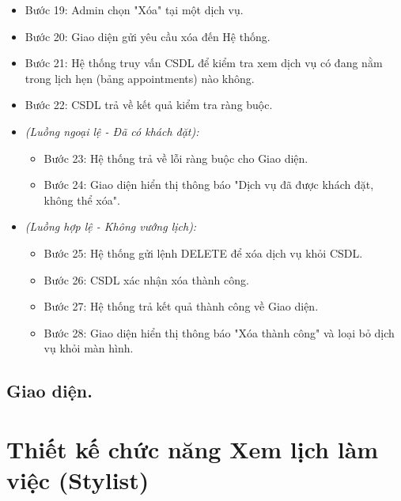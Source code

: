 \documentclass[../BTL.tex]{subfiles}
\begin{document}
\begin{itemize}
\item
  Bước 19: Admin chọn "Xóa" tại một dịch vụ.
\item
  Bước 20: Giao diện gửi yêu cầu xóa đến Hệ thống.
\item
  Bước 21: Hệ thống truy vấn CSDL để kiểm tra xem dịch vụ có đang nằm
  trong lịch hẹn (bảng appointments) nào không.
\item
  Bước 22: CSDL trả về kết quả kiểm tra ràng buộc.
\item
  \emph{(Luồng ngoại lệ - Đã có khách đặt):}

  \begin{itemize}
  \item
    Bước 23: Hệ thống trả về lỗi ràng buộc cho Giao diện.
  \item
    Bước 24: Giao diện hiển thị thông báo "Dịch vụ đã được khách đặt,
    không thể xóa".
  \end{itemize}
\item
  \emph{(Luồng hợp lệ - Không vướng lịch):}

  \begin{itemize}
  \item
    Bước 25: Hệ thống gửi lệnh DELETE để xóa dịch vụ khỏi CSDL.
  \item
    Bước 26: CSDL xác nhận xóa thành công.
  \item
    Bước 27: Hệ thống trả kết quả thành công về Giao diện.
  \item
    Bước 28: Giao diện hiển thị thông báo "Xóa thành công" và loại bỏ
    dịch vụ khỏi màn hình.
  \end{itemize}
\end{itemize}

\subsection{Giao diện.}

\section{Thiết kế chức năng Xem lịch làm việc (Stylist)}
\end{document}
